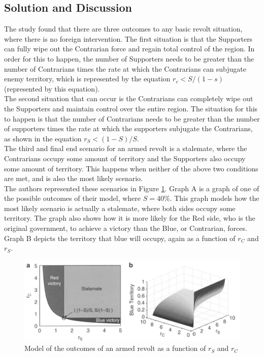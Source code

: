 \documentclass{article}
\begin{document}
\subsection{Solution and Discussion}
The study found that there are three outcomes to any basic revolt situation, where there is no foreign intervention. The first situation is that the Supporters can fully wipe out the Contrarian force and regain total control of the region. In order for this to happen, the number of Supporters needs to be greater than the number of Contrarians times the rate at which the Contrarians can subjugate enemy territory, which is represented by the equation $r_{c} < S/(1-s)$ (represented by this equation). 
\medskip
\\The second situation that can occur is the Contrarians can completely wipe out the Supporters and maintain control over the entire region. The situation for this to happen is that the number of Contrarians needs to be greater than the number of supporters times the rate at which the supporters subjugate the Contrarians, as shown in the equation $r_{S} < (1-S)/S$.
\medskip
\\The third and final end scenario for an armed revolt is a stalemate, where the Contrarians occupy some amount of territory and the Supporters also occupy some amount of territory. This happens when neither of the above two conditions are met, and is also the most likely scenario.
\medskip
\\The authors represented these scenarios in Figure \ref{fig: random}. Graph A is a graph of one of the possible outcomes of their model, where $S = 40\%$. This graph models how the most likely scenario is actually a stalemate, where both sides occupy some territory. The graph also shows how it is more likely for the Red side, who is the original government, to achieve a victory than the Blue, or Contrarian, forces. Graph B depicts the territory that blue will occupy, again as a function of $r_{C}$ and $r_{S}$. 
\begin{figure}[h]
    \centering
    \includegraphics[scale = 0.35]{graphs.png}
    \caption{Model of the outcomes of an armed revolt as a function of $r_{S}$ and $r_{C}$}
    \label{fig: random}
\end{figure}
\end{document}
